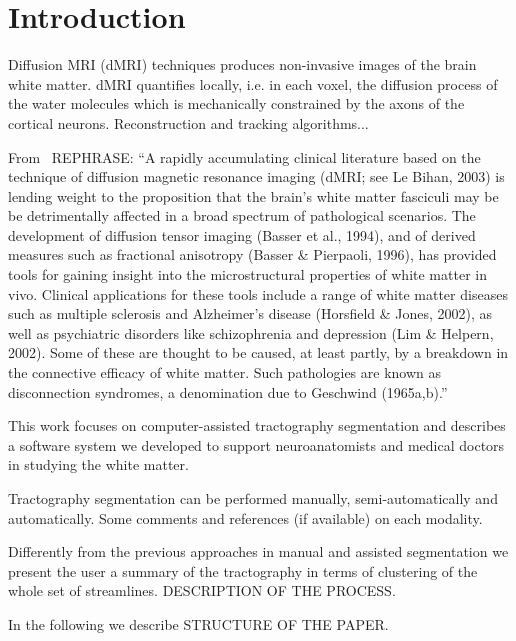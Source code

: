 \section{Introduction}
\label{sec:introduction}

Diffusion MRI (dMRI) techniques produces non-invasive images of the
brain white matter. dMRI quantifies locally, i.e. in each voxel, the
diffusion process of the water molecules which is mechanically
constrained by the axons of the cortical neurons. Reconstruction and
tracking algorithms...

From~\cite{clayden2009reproducibility} REPHRASE: ``A rapidly
accumulating clinical literature based on the technique of diffusion
magnetic resonance imaging (dMRI; see Le Bihan, 2003) is lending
weight to the proposition that the brain’s white matter fasciculi may
be be detrimentally affected in a broad spectrum of pathological
scenarios. The development of diffusion tensor imaging (Basser et al.,
1994), and of derived measures such as fractional anisotropy (Basser
\& Pierpaoli, 1996), has provided tools for gaining insight into the
microstructural properties of white matter in vivo. Clinical
applications for these tools include a range of white matter diseases
such as multiple sclerosis and Alzheimer’s disease (Horsfield \&
Jones, 2002), as well as psychiatric disorders like schizophrenia and
depression (Lim \& Helpern, 2002). Some of these are thought to be
caused, at least partly, by a breakdown in the connective efficacy of
white matter. Such pathologies are known as disconnection syndromes, a
denomination due to Geschwind (1965a,b).''

This work focuses on computer-assisted tractography segmentation and
describes a software system we developed to support neuroanatomists
and medical doctors in studying the white matter.

Tractography segmentation can be performed manually,
semi-automatically and automatically. Some comments and references (if
available) on each modality.

Differently from the previous approaches in manual and assisted
segmentation we present the user a summary of the tractography in
terms of clustering of the whole set of streamlines. DESCRIPTION OF
THE PROCESS.

In the following we describe STRUCTURE OF THE PAPER.

